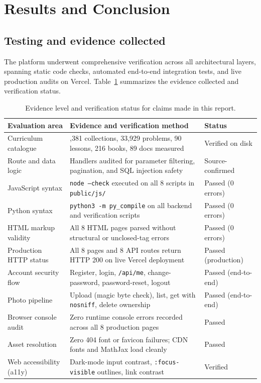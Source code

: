 \section{Results and Conclusion}\label{chap:results}

\subsection{Testing and evidence collected}
The platform underwent comprehensive verification across all architectural layers, spanning static code
checks, automated end-to-end integration tests, and live production audits on Vercel.
Table~\ref{tab:evidence} summarizes the evidence collected and verification status.

\begin{table}[ht]
\centering\small
\begin{tabularx}{\textwidth}{@{}l >{\raggedright\arraybackslash}X l@{}}
\toprule
\textbf{Evaluation area} & \textbf{Evidence and verification method} & \textbf{Status}\\
\midrule
Curriculum catalogue & 3,381 collections, 33,929 problems, 90 lessons, 216 books, 89 docs measured & Verified on disk\\
Route and data logic & Handlers audited for parameter filtering, pagination, and SQL injection safety & Source-confirmed\\
JavaScript syntax & \texttt{node --check} executed on all 8 scripts in \texttt{public/js/} & Passed (0 errors)\\
Python syntax & \texttt{python3 -m py\_compile} on all backend and verification scripts & Passed (0 errors)\\
HTML markup validity & All 8 HTML pages parsed without structural or unclosed-tag errors & Passed (0 errors)\\
Production HTTP status & All 8 pages and 8 API routes return HTTP 200 on live Vercel deployment & Passed (production)\\
Account security flow & Register, login, \texttt{/api/me}, change-password, password-reset, logout & Passed (end-to-end)\\
Photo pipeline & Upload (magic byte check), list, get with \texttt{nosniff}, delete ownership & Passed (end-to-end)\\
Browser console audit & Zero runtime console errors recorded across all 8 production pages & Passed\\
Asset resolution & Zero 404 font or favicon failures; CDN fonts and MathJax load cleanly & Passed\\
Web accessibility (a11y) & Dark-mode input contrast, \texttt{:focus-visible} outlines, link contrast & Verified\\
\bottomrule
\end{tabularx}
\caption{Evidence level and verification status for claims made in this report.}
\label{tab:evidence}
\end{table}

